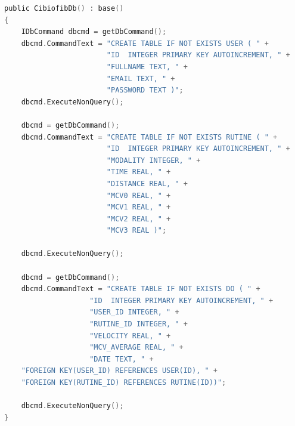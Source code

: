\begin{center}
\begin{minipage}{0.8\textwidth}
\begin{lstlisting}[language=c,caption={Sección de código, constructor de la clase CibiofibDb}, label={code: database-code}]
public CibiofibDb() : base()
{
    IDbCommand dbcmd = getDbCommand();
    dbcmd.CommandText = "CREATE TABLE IF NOT EXISTS USER ( " +
                        "ID  INTEGER PRIMARY KEY AUTOINCREMENT, " +
                        "FULLNAME TEXT, " +
                        "EMAIL TEXT, " +
                        "PASSWORD TEXT )";
    dbcmd.ExecuteNonQuery();

    dbcmd = getDbCommand();
    dbcmd.CommandText = "CREATE TABLE IF NOT EXISTS RUTINE ( " +
                        "ID  INTEGER PRIMARY KEY AUTOINCREMENT, " +
                        "MODALITY INTEGER, " +
                        "TIME REAL, " +
                        "DISTANCE REAL, " +
                        "MCV0 REAL, " +
                        "MCV1 REAL, " +
                        "MCV2 REAL, " +
                        "MCV3 REAL )";

    dbcmd.ExecuteNonQuery();

    dbcmd = getDbCommand();
    dbcmd.CommandText = "CREATE TABLE IF NOT EXISTS DO ( " +
                    "ID  INTEGER PRIMARY KEY AUTOINCREMENT, " +
                    "USER_ID INTEGER, " +
                    "RUTINE_ID INTEGER, " +
                    "VELOCITY REAL, " +
                    "MCV_AVERAGE REAL, " +
                    "DATE TEXT, " +
    "FOREIGN KEY(USER_ID) REFERENCES USER(ID), " +
    "FOREIGN KEY(RUTINE_ID) REFERENCES RUTINE(ID))";

    dbcmd.ExecuteNonQuery();
}
\end{lstlisting}
\end{minipage}
\end{center}